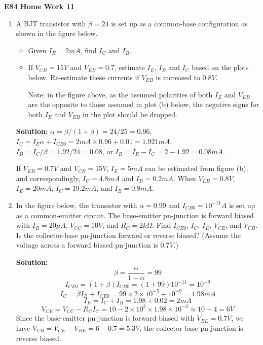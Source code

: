 \usepackage{html}

\begin{center}
{\Large \bf  E84 Home Work 11}
\end{center}

\begin{enumerate}

\item A BJT transistor with $\beta=24$ is set up as a common-base 
configuration as shown in the figure below. 

\begin{itemize} 
\item Given $I_E=2 mA$, find $I_C$ and $I_B$.
\item If $V_{CB}=15V$ and $V_{EB}=0.7$, estimate $I_E$, $I_B$ and $I_C$ 
  based on the plots below. Re-estimate these currents if $V_{EB}$ is 
  increased to $0.8V$.

  Note: in the figure above, as the assumed polarities of both $I_E$ and 
  $V_{EB}$ are the opposite to those assumed in plot (b) below, the negative
  signs for both $I_E$ and $V_{EB}$ in the plot should be dropped.

\end{itemize}


{\bf Solution:} $\alpha=\beta/(1+\beta)=24/25=0.96$, 
$I_C=I_E \alpha + I_{CB0}=2 mA \times 0.96+0.01=1.921 mA$,
$I_B=I_C/\beta=1.92/24=0.08$, or $I_B=I_E-I_C=2-1.92=0.08 mA$.

If $V_{EB}=0.7 V$ and $V_{CB}=15V$, $I_E=5 mA$ can be estimated from 
figure (b), and correspondingly, $I_C=4.8 mA$ and $I_B=0.2 mA$. When 
$V_{EB}=0.8 V$, $I_E=20 mA$, $I_C=19.2 mA$, and $I_B=0.8 mA$.

\item In the figure below, the transistor with $\alpha=0.99$ and
  $I_{CB0}=10^{-11} A$ is set up as a common-emitter circuit. The
  base-emitter pn-junction is forward biased with $I_B=20 \mu A$, 
  $V_{CC}=10V$, and $R_C=2k\Omega$. Find $I_{CE0}$, $I_C$, $I_E$, 
  $V_{CE}$, and $V_{CB}$. Is the collector-base pn-junction forward
  or reverse biased? (Assume the voltage across a forward biased 
  pn-junction is $0.7 V$.)
  

{\bf Solution:} 
\[ \beta=\frac{\alpha}{1-\alpha}=99 \]
\[ I_{CE0}=(1+\beta) I_{CB0}=(1+99) 10^{-11}=10^{-9} \]
\[ I_C=\beta I_B+I_{CE0}=99 \times 2 \times 10^{-5} + 10^{-9}=1.98 mA \]
\[ I_E=I_C+I_B=1.98+0.02=2 mA \]
\[ V_{CE}=V_{CC}-R_C I_C=10-2 \times 10^3 \times 1.98 \times 10^{-3}
   \approx 10-4=6 V \]
Since the base-emitter pn-junction is forward biased with $V_{BE}=0.7V$,
we have $V_{CB}=V_{CE}-V_{BE}=6-0.7=5.3 V$, the collector-base pn-junction
is reverse biased.


\end{enumerate}
